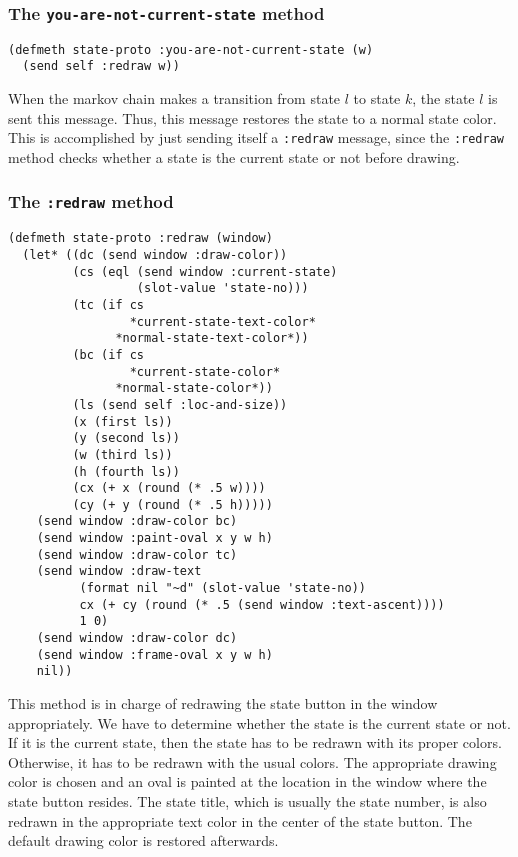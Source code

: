 \subsubsection{The {\tt you-are-not-current-state} method}
\label{subsubsec:you-are-not-current-state}
\begin{verbatim}
(defmeth state-proto :you-are-not-current-state (w)
  (send self :redraw w))
\end{verbatim}
When the markov chain makes a transition from state $l$ to state $k$,
the state $l$ is sent this message.  Thus, this message restores the
state to a normal state color.  This is accomplished by just sending
itself a {\tt :redraw} message, since the {\tt :redraw} method checks
whether a state is the current state or not before drawing.

\subsubsection{The {\tt :redraw} method}
\label{subsubsec:state-redraw}
\begin{verbatim}
(defmeth state-proto :redraw (window)
  (let* ((dc (send window :draw-color))
         (cs (eql (send window :current-state) 
                  (slot-value 'state-no)))
         (tc (if cs
                 *current-state-text-color*
               *normal-state-text-color*))
         (bc (if cs
                 *current-state-color*
               *normal-state-color*))
         (ls (send self :loc-and-size))
         (x (first ls))
         (y (second ls))
         (w (third ls))
         (h (fourth ls))
         (cx (+ x (round (* .5 w))))
         (cy (+ y (round (* .5 h)))))
    (send window :draw-color bc)
    (send window :paint-oval x y w h)
    (send window :draw-color tc)
    (send window :draw-text 
          (format nil "~d" (slot-value 'state-no))
          cx (+ cy (round (* .5 (send window :text-ascent))))
          1 0)
    (send window :draw-color dc)
    (send window :frame-oval x y w h)
    nil))
\end{verbatim}
This method is in charge of redrawing the state button in the window
appropriately. We have to determine whether the state is the current
state or not.  If it is the current state, then the state has to be
redrawn with its proper colors. Otherwise, it has to be redrawn with
the usual colors.  The appropriate drawing color is chosen and an oval
is painted at the location in the window where the state button
resides. The state title, which is usually the state number,  is also
redrawn in the appropriate text color in the center of the state
button.  The default drawing color is restored afterwards.  


